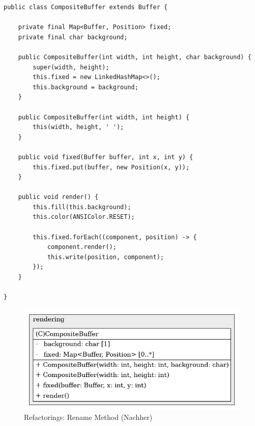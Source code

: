 \vspace{0.5cm}
\begin{lstlisting}[caption={Refactorings: Rename Method (Nachher)}]
public class CompositeBuffer extends Buffer {
    
    private final Map<Buffer, Position> fixed;
    private final char background;
    
    public CompositeBuffer(int width, int height, char background) {
        super(width, height);
        this.fixed = new LinkedHashMap<>();
        this.background = background;
    }
    
    public CompositeBuffer(int width, int height) {
        this(width, height, ' ');
    }
    
    public void fixed(Buffer buffer, int x, int y) {
        this.fixed.put(buffer, new Position(x, y));
    }
    
    public void render() {
        this.fill(this.background);
        this.color(ANSIColor.RESET);
        
        this.fixed.forEach((component, position) -> {
            component.render();
            this.write(position, component);
        });
    }
    
}
\end{lstlisting}

\vspace{0.5cm}
\begin{figure}[H]
    \centering
    \includegraphics[width=0.6\linewidth]{Bilder/Visualisierung/CompositeBufferFixedFunction_structure.png}
    \caption{Refactorings: Rename Method (Nachher)}
\end{figure}
